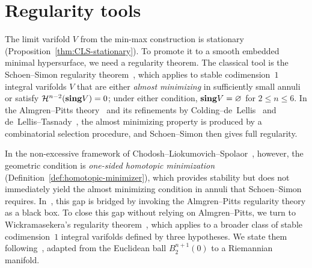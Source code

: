 
\section{Regularity tools}\label{sec:regularity-tools}

The limit varifold $V$ from the min-max construction is stationary (Proposition~\ref{thm:CLS-stationary}). To promote it to a smooth embedded minimal hypersurface, we need a regularity theorem. The classical tool is the Schoen--Simon regularity theorem~\cite{SS81}, which applies to stable codimension~$1$ integral varifolds $V$ that are either \emph{almost minimizing} in sufficiently small annuli or satisfy $\mathcal{H}^{n-2}(\mathbf{sing} V) = 0$; under either condition, $\mathbf{sing} V = \varnothing$ for $2 \leq n \leq 6$. In the Almgren--Pitts theory~\cite{Alm65, Pit81} and its refinements by Colding--de~Lellis~\cite{CL03} and de~Lellis--Tasnady~\cite{DLT13}, the almost minimizing property is produced by a combinatorial selection procedure, and Schoen--Simon then gives full regularity.

In the non-excessive framework of Chodosh--Liokumovich--Spolaor~\cite{CLS22}, however, the geometric condition is \emph{one-sided homotopic minimization} (Definition~\ref{def:homotopic-minimizer}), which provides stability but does not immediately yield the almost minimizing condition in annuli that Schoen--Simon requires. In~\cite{CLS22}, this gap is bridged by invoking the Almgren--Pitts regularity theory as a black box. To close this gap without relying on Almgren--Pitts, we turn to Wickramasekera's regularity theorem~\cite{Wic14}, which applies to a broader class of stable codimension~$1$ integral varifolds defined by three hypotheses. We state them following~\cite[Section~2]{Wic14}, adapted from the Euclidean ball $B_2^{n+1}(0)$ to a Riemannian manifold.

